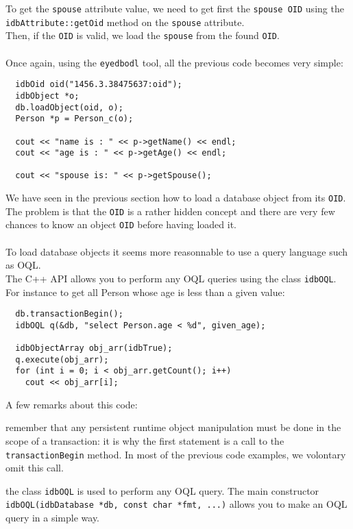 \normalsize
To get the \texttt{spouse} attribute value, we need to get first the
\texttt{spouse OID} using the \texttt{idbAttribute::getOid} method on
the \texttt{spouse} attribute.
\\
Then, if the \texttt{OID} is valid, we load the \texttt{spouse} from the
found \texttt{OID}.
\\
\\
Once again, using the \texttt{eyedbodl} tool, all the previous code
becomes very simple:
\verbsize
\begin{verbatim}
  idbOid oid("1456.3.38475637:oid");
  idbObject *o;
  db.loadObject(oid, o);
  Person *p = Person_c(o);

  cout << "name is : " << p->getName() << endl;
  cout << "age is : " << p->getAge() << endl;

  cout << "spouse is: " << p->getSpouse();
\end{verbatim}
\normalsize
{}
We have seen in the previous section how to load a database object from its
\texttt{OID}. The problem is that the \texttt{OID} is a rather
hidden concept and there are very few chances to know an object \texttt{OID}
before having loaded it.
\\
\\
To load database objects it seems more reasonnable to use a query language
such as OQL.
\\
The \eyedb C++ API allows you to perform any OQL queries using the class
\texttt{idbOQL}.
\\
For instance to get all Person whose age is less than a given value:
\verbsize
\begin{verbatim}
  db.transactionBegin();
  idbOQL q(&db, "select Person.age < %

  idbObjectArray obj_arr(idbTrue);
  q.execute(obj_arr);
  for (int i = 0; i < obj_arr.getCount(); i++)
    cout << obj_arr[i];
\end{verbatim}
\normalsize
A few remarks about this code:
\be
\item remember that any persistent runtime object manipulation must be done
in the scope of a transaction: it is why the first statement is a call
to the \texttt{transactionBegin} method. In most of the previous code examples,
we volontary omit this call.
\item the class \texttt{idbOQL} is used to perform
any OQL query. The main constructor \texttt{idbOQL(idbDatabase *db, const char *fmt, ...)} allows you to make an OQL query in a simple way.
